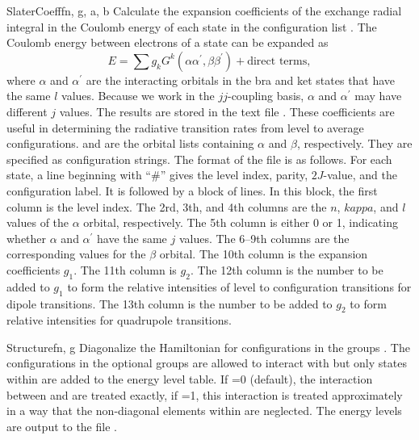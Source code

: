 \begin{fundesc}{SlaterCoeff}{fn, g, a, b}
Calculate the expansion coefficients of the exchange radial integral in the
Coulomb energy of each state in the configuration list  . The Coulomb
energy between electrons of a state can be expanded as
\begin{equation}
E = \sum g_kG^k(\alpha\alpha^\prime,\beta\beta^\prime) + \mbox{direct terms},
\end{equation}
where $\alpha$ and $\alpha^\prime$ are the interacting orbitals in the bra and
ket states that have the same $l$ values. Because we work in the $jj$-coupling
basis, $\alpha$ and $\alpha^\prime$ may have different $j$ values. The results
are stored in the text file . These coefficients are useful in
determining the radiative transition rates from level to average configurations.
 and  are the orbital lists containing $\alpha$ and $\beta$,
respectively. They are specified as configuration strings. The format of the
file is as follows. For each state, a line beginning with ``\#'' gives the level
index, parity, $2J$-value, and the configuration label. It is followed by a
block of lines. In this block, the first column is the level index. The 2rd,
3th, and 4th columns are the $n$, $kappa$, and $l$ values of the $\alpha$
orbital, respectively. The 5th column is either 0 or 1, indicating whether
$\alpha$ and $\alpha^\prime$ have the same $j$ values. The 6--9th  columns are
the corresponding values for the $\beta$ orbital. The 10th column is the
expansion coefficients $g_1$. The 11th column is $g_2$. The 12th column is the
number to be added to $g_1$ to form the relative intensities of level to
configuration transitions for dipole transitions. The 13th column is the number
to be added to $g_2$ to form relative intensities for quadrupole transitions.
\end{fundesc}

\begin{fundesc}{Structure}{fn, g}
Diagonalize the Hamiltonian for configurations in the groups . The
configurations in the optional groups  are allowed to interact with
 but only states within  are added to the energy level table. If
=0 (default), the interaction between  and  are treated
exactly, if =1, this interaction is treated approximately in a way that
the non-diagonal elements within  are neglected. The energy levels are
output to the file .
\end{fundesc}

